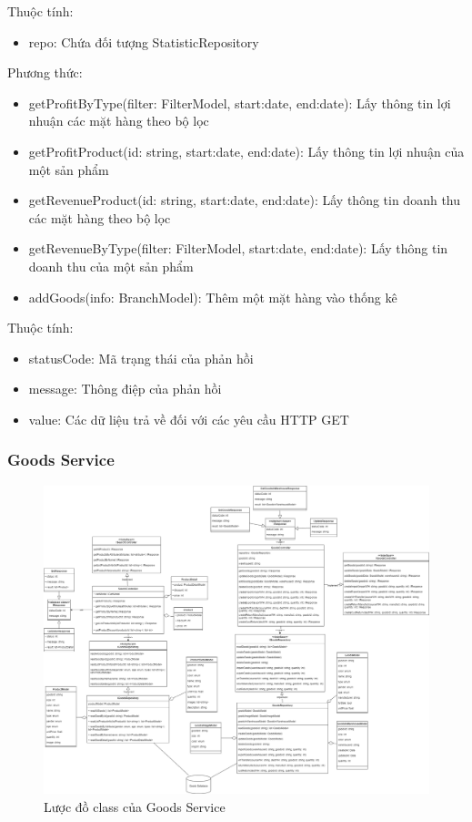Thuộc tính:
\begin{itemize}
	\item repo: Chứa đối tượng StatisticRepository
\end{itemize}
Phương thức:
\begin{itemize}
	\item getProfitByType(filter: FilterModel, start:date,
	end:date): Lấy thông tin lợi nhuận các mặt hàng theo bộ lọc
	\item getProfitProduct(id: string, start:date,
	end:date): Lấy thông tin lợi nhuận của một sản phẩm
	\item getRevenueProduct(id: string, start:date,
	end:date): Lấy thông tin doanh thu các mặt hàng theo bộ lọc
	\item getRevenueByType(filter: FilterModel, start:date,
	end:date): Lấy thông tin doanh thu của một sản phẩm
	\item addGoods(info: BranchModel): Thêm một mặt hàng vào thống kê
\end{itemize}

Thuộc tính:
\begin{itemize}
	\item statusCode: Mã trạng thái của phản hồi
	\item message: Thông điệp của phản hồi
	\item value: Các dữ liệu trả về đối với các yêu cầu HTTP GET
\end{itemize}



\subsubsection{Goods Service}
\begin{figure}[!htp]
	\centering
	\includegraphics[width=17cm]{img/Architecture/service/GoodsService.png}
	\newline
	\caption{Lược đồ class của Goods Service}
\end{figure}


